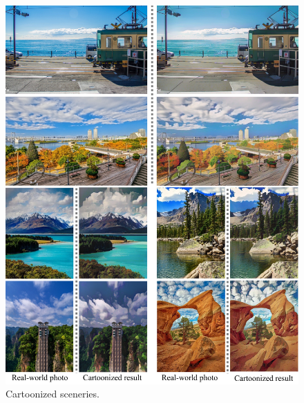 \documentclass[10pt,twocolumn,letterpaper]{article}
\begin{document}
\begin{figure}[b]
\centering
\includegraphics[width=\linewidth]{figures/scenery2.pdf}
\caption{Cartoonized sceneries.}
\label{fig:scenery2}
\end{figure}
\end{document}
